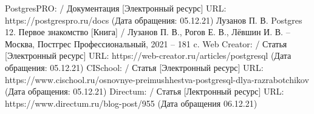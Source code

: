 
\begin{thebibliography}{7}
     PostgresPRO: / Документация [Электронный ресурс] URL: https://postgrespro.ru/docs (Дата обращения: 05.12.21)
     Лузанов П. В. Postgres 12. Первое знакомство [Книга] / Лузанов П. В., Рогов Е. В., Лёвшин И. В. -- Москва, Постгрес Профессиональный, 2021 -- 181 c.
     Web Creator: / Статья [Электронный ресурс] URL: https://web-creator.ru/articles/postgresql (Дата обращения: 05.12.21)
     CISchool: / Статья [Электронный ресурс] URL: https://www.cischool.ru/osnovnye-preimushhestva-postgresql-dlya-razrabotchikov (Дата обращения: 05.12.21)
     Directum: / Статья [Лектронный ресурс] URL: https://www.directum.ru/blog-post/955 (Дата обращения 06.12.21)
\end{thebibliography}

\newpage